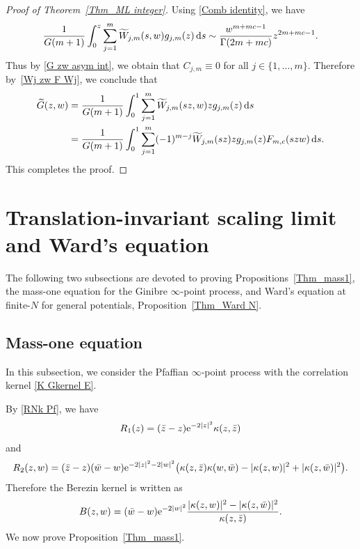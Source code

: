 \documentclass[pdftex]{sigma}
\numberwithin{equation}{section}
\newcommand{\1}{\chi}
\begin{document}
\begin{proof}[Proof of Theorem~\ref{Thm_ML integer}]
	Using \eqref{Comb identity}, we have
	\begin{gather*}
	\frac{1}{G(m+1)}\int_0^z \sum_{j=1}^{m} 	\widetilde{W}_{j,m}(s,w) g_{j,m}(z)\,{\rm d}s \sim \frac{w^{m+mc-1}}{ \Gamma(2m+mc) } z^{2m+mc-1}.
	\end{gather*}
	Thus by \eqref{G zw asym int}, we obtain that $C_{j,m} \equiv 0$ for all $j \in \{1,\dots, m\}$.
	Therefore by~\eqref{Wj zw F Wj}, we conclude that
	\begin{align*}
		\widetilde{G}(z,w)&= \frac{1}{G(m+1)}\int_0^1 \sum_{j=1}^{m} 	\widetilde{W}_{j,m}(sz,w) z g_{j,m}(z)\,{\rm d}s
		\\
		&= \frac{1}{G(m+1)}\int_0^1 \sum_{j=1}^{m} (-1)^{m-j} 	\widetilde{W}_{j,m}(sz) z g_{j,m}(z)F_{m,c}(szw)\,{\rm d}s.
	\end{align*}
	This completes the proof.
\end{proof}

\section{Translation-invariant scaling limit and Ward's equation}

The following two subsections are devoted to proving Propositions~\ref{Thm_mass1}, the mass-one equation for the Ginibre $\infty$-point process, and
Ward's equation at finite-$N$ for general potentials, Proposition~\ref{Thm_Ward N}.

\subsection{Mass-one equation}

In this subsection, we consider the Pfaffian $\infty$-point process with the correlation kernel \eqref{K Gkernel E}.

By \eqref{RNk Pf}, we have
\begin{gather*}
R_1(z)=(\bar{z}-z){\rm e}^{ -2|z|^2 } \kappa(z,\bar{z})
\end{gather*}
and
\begin{gather*}
	R_2(z,w)=(\bar{z}-z)(\bar{w}-w) {\rm e}^{ -2|z|^2-2|w|^2 }
\big( \kappa(z,\bar{z}) \kappa(w,\bar{w})-|\kappa(z,w)|^2+|\kappa(z,\bar{w})|^2 \big).
\end{gather*}
Therefore the Berezin kernel is written as
\begin{gather} \label{B}
	B(z,w)= (\bar{w}-w) {\rm e}^{ -2|w|^2 } \frac{ |\kappa(z,w)|^2-|\kappa(z,\bar{w})|^2 }{ \kappa(z,\bar{z})}.
\end{gather}
We now prove Proposition~\ref{Thm_mass1}.
\end{document}
